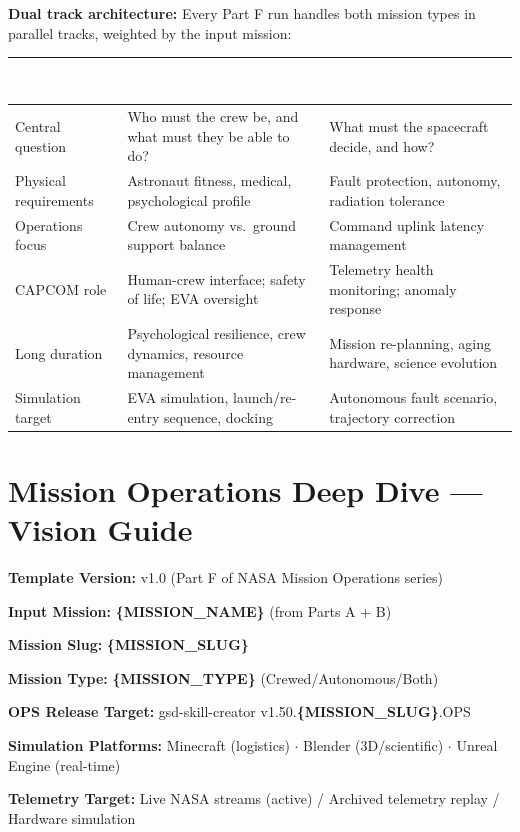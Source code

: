 \documentclass[11pt,letterpaper]{article}
\newcommand{\stageheader}[2]{%
  \noindent\colorbox{#2}{\makebox[\textwidth][l]{%
    \textcolor{white}{\bfseries\sffamily\hspace{6pt}#1\hspace{6pt}}}}%
  \vspace{0.5em}\par%
}
\newcommand{\metafield}[2]{\textbf{\sffamily #1} #2\par}
\newcommand{\param}[1]{\textcolor{paramred}{\textbf{\{#1\}}}}
\newcommand{\tableheader}[1]{\textbf{\sffamily\textcolor{white}{#1}}}
\begin{document}
\textbf{Dual track architecture:} Every Part F run handles both mission types in parallel tracks, weighted by the input mission:

\begin{center}
\begin{tabularx}{\textwidth}{L{3.5cm}L{5.5cm}L{5cm}}
\toprule
{}
\tableheader{Dimension} & \tableheader{Track A: Crewed Mission} & \tableheader{Track B: Autonomous Mission} \\
\midrule
Central question & Who must the crew be, and what must they be able to do? & What must the spacecraft decide, and how? \\
Physical requirements & Astronaut fitness, medical, psychological profile & Fault protection, autonomy, radiation tolerance \\
Operations focus & Crew autonomy vs.\ ground support balance & Command uplink latency management \\
CAPCOM role & Human-crew interface; safety of life; EVA oversight & Telemetry health monitoring; anomaly response \\
Long duration & Psychological resilience, crew dynamics, resource management & Mission re-planning, aging hardware, science evolution \\
Simulation target & EVA simulation, launch/re-entry sequence, docking & Autonomous fault scenario, trajectory correction \\
\bottomrule
\end{tabularx}
\end{center}

\newpage
\tableofcontents
\newpage

\stageheader{STAGE 1 --- VISION DOCUMENT}{primary}

\section{Mission Operations Deep Dive --- Vision Guide}

\metafield{Template Version:}{v1.0 (Part F of NASA Mission Operations series)}
\metafield{Input Mission:}{\param{MISSION\_NAME} (from Parts A + B)}
\metafield{Mission Slug:}{\param{MISSION\_SLUG}}
\metafield{Mission Type:}{\param{MISSION\_TYPE} (Crewed/Autonomous/Both)}
\metafield{OPS Release Target:}{gsd-skill-creator v1.50.\param{MISSION\_SLUG}.OPS}
\metafield{Simulation Platforms:}{Minecraft (logistics) $\cdot$ Blender (3D/scientific) $\cdot$ Unreal Engine (real-time)}
\metafield{Telemetry Target:}{Live NASA streams (active) / Archived telemetry replay / Hardware simulation}
\end{document}
